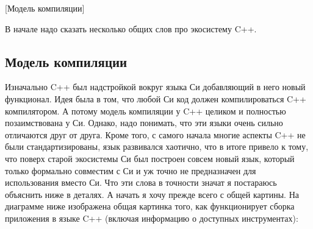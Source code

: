 [Модель компиляции]


В начале надо сказать несколько общих слов про экосистему C++.

\subsection{Модель компиляции}

Изначально C++ был надстройкой вокруг языка Си добавляющий в него новый функционал.
Идея была в том, что любой Си код должен компилироваться C++ компилятором.
А потому модель компиляции у C++ целиком и полностью позаимствована у Си.
Однако, надо понимать, что эти языки очень сильно отличаются друг от друга.
Кроме того, с самого начала многие аспекты C++ не были стандартизированы, язык развивался хаотично, что в итоге привело к тому, что поверх старой экосистемы Си был построен совсем новый язык, который только формально совместим с Си и уж точно не предназначен для использования вместо Си.
Что эти слова в точности значат я постараюсь объяснить ниже в деталях.
А начать я хочу прежде всего с общей картины.
На диаграмме ниже изображена общая картинка того, как функционирует сборка приложения в языке C++ (включая информацию о доступных инструментах):
